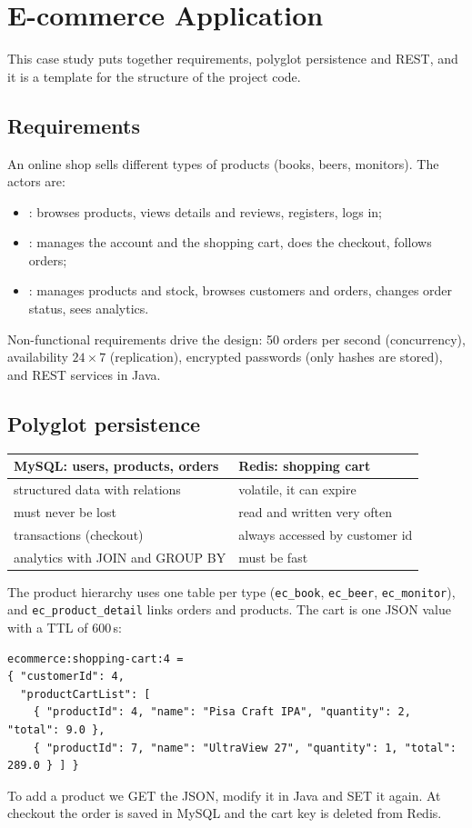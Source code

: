 \section{E-commerce Application}\label{sec:ecommerce}

This case study puts together requirements, polyglot persistence and REST, and it is a template for the structure of the project code.

\subsection{Requirements}
An online shop sells different types of products (books, beers, monitors). The actors are:
\begin{itemize}
  \item {}: browses products, views details and reviews, registers, logs in;
  \item {}: manages the account and the shopping cart, does the checkout, follows orders;
  \item {}: manages products and stock, browses customers and orders, changes order status, sees analytics.
\end{itemize}
Non-functional requirements drive the design: 50 orders per second (concurrency), availability $24\times7$ (replication), encrypted passwords (only hashes are stored), and REST services in Java.

\subsection{Polyglot persistence}
\begin{center}\small
\begin{tabular}{p{6.7cm}p{6.7cm}}
\toprule
\textbf{MySQL: users, products, orders} & \textbf{Redis: shopping cart} \\
\midrule
structured data with relations & volatile, it can expire \\
must never be lost & read and written very often \\
transactions (checkout) & always accessed by customer id \\
analytics with JOIN and GROUP BY & must be fast \\
\bottomrule
\end{tabular}
\end{center}

The product hierarchy uses one table per type (\texttt{ec\_book}, \texttt{ec\_beer}, \texttt{ec\_monitor}), and \texttt{ec\_product\_detail} links orders and products. The cart is one JSON value with a TTL of 600\,s:
\begin{lstlisting}
ecommerce:shopping-cart:4 =
{ "customerId": 4,
  "productCartList": [
    { "productId": 4, "name": "Pisa Craft IPA", "quantity": 2, "total": 9.0 },
    { "productId": 7, "name": "UltraView 27", "quantity": 1, "total": 289.0 } ] }
\end{lstlisting}
To add a product we GET the JSON, modify it in Java and SET it again. At checkout the order is saved in MySQL and the cart key is deleted from Redis.

